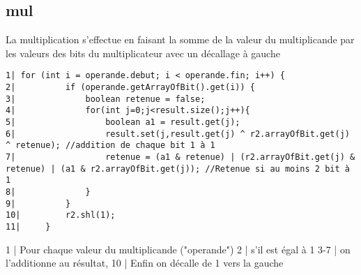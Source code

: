 \documentclass{article}
\begin{document}
\subsection{mul}
La multiplication s'effectue en faisant la somme de la valeur du multiplicande par les valeurs des bits du multiplicateur avec un décallage à gauche
\begin{verbatim}
1| for (int i = operande.debut; i < operande.fin; i++) {
2|          if (operande.getArrayOfBit().get(i)) {
3|              boolean retenue = false;
4|              for(int j=0;j<result.size();j++){
5|                  boolean a1 = result.get(j);
6|                  result.set(j,result.get(j) ^ r2.arrayOfBit.get(j) ^ retenue); //addition de chaque bit 1 à 1
7|                  retenue = (a1 & retenue) | (r2.arrayOfBit.get(j) & retenue) | (a1 & r2.arrayOfBit.get(j)); //Retenue si au moins 2 bit à 1
8|              }
9|          }
10|         r2.shl(1);
11|     }
\end{verbatim}
1 | Pour chaque valeur du multiplicande ("operande")
2 | s'il est égal à 1
3-7 | on l'additionne au résultat,
10 | Enfin on décalle de 1 vers la gauche
\end{document}
